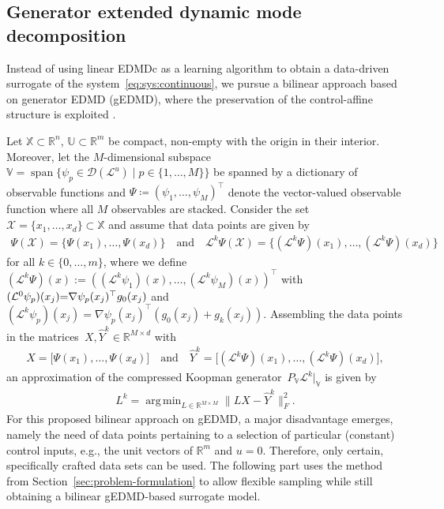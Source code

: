 \documentclass[a4paper, reqno]{amsart}
\newcommand{\R}{\ensuremath{\mathbb R}}
\DeclareMathOperator*{\argmin}{arg\,min}
\begin{document}
\subsection{Generator extended dynamic mode decomposition}
\label{subsec:generator:EDMD}

Instead of using linear EDMDc \cite{proctor2016dynamic, korda2018linear} as a learning algorithm to obtain a data-driven surrogate of the system~\eqref{eq:sys:continuous}, we pursue a bilinear approach based on generator EDMD (gEDMD), where the preservation of the control-affine structure is exploited \cite{williams2016extending, surana2016koopman, peitz:otto:rowley:2020}. 

Let $\mathbb{X} \subset \R^n$, $\mathbb{U} \subset \R^m$ be compact, non-empty with the origin in their interior. 
Moreover, let the $M$-dimensional subspace~$\mathbb{V} = \operatorname{span} \{\psi_p \in \mathcal{D}(\mathcal{L}^{u})  \mid p \in \{1, \dots, M\}\}$ be spanned by a dictionary of observable functions and $\Psi \coloneqq (\psi_1, \dots, \psi_M)^\top$ denote the vector-valued observable function where all $M$ observables are stacked. Consider the set $\mathcal{X} = \{x_1, \ldots, x_d\} \subset \mathbb{X}$ and assume that data points are given by 
\begin{align*}
    \Psi(\mathcal{X}) = \{\Psi(x_1), \dots, \Psi(x_d)\} \quad \text{and} \quad \mathcal{L}^k\Psi(\mathcal{X}) = \{(\mathcal{L}^k\Psi)(x_1), \dots, (\mathcal{L}^k\Psi)(x_d)\}
\end{align*}
for all $k \in \{0, \dots, m\}$, where we define $(\mathcal{L}^k\Psi)(x) := ((\mathcal{L}^k\psi_1)(x), \dots, (\mathcal{L}^k\psi_M)(x))^\top $ with $(\mathcal{L}^0\psi_p)(x_j) \hspace*{-1mm}=\hspace*{-1mm} \nabla \psi_p(x_j)^\top g_0(x_j)$ and $(\mathcal{L}^k\psi_p)(x_j) = \nabla \psi_p(x_j)^\top (g_0(x_j) + g_k(x_j))$. 
Assembling the data points in the matrices~$X, \hat{Y}^k \in \R^{M \times d}$ with 
\begin{align}\label{eq:generator:datamatrix}
    X = \Big[\Psi(x_1), \dots, \Psi(x_d)\Big]
    \quad \text{and} \quad 
    \hat{Y}^k = \Big[(\mathcal{L}^k\Psi)(x_1), \dots, (\mathcal{L}^k\Psi)(x_d)\Big],
\end{align}
an approximation of the compressed Koopman generator~$P_{\mathbb{V}}\mathcal{L}^k|_{\mathbb{V}}$ is given by
\begin{align} \label{eq:generator:regression}
    L^k = \argmin_{L \in \R^{M \times M}} \|LX - \hat{Y}^k\|_F^2.
\end{align}
For this proposed bilinear approach on gEDMD, a major disadvantage emerges, namely the need of data points pertaining to a selection of particular (constant) 
control inputs, e.g., the unit vectors of $\R^m$ and $u = 0$. 
Therefore, only certain, specifically crafted data sets can be used. 
The following part uses the method from Section~\ref{sec:problem-formulation} to allow flexible sampling while still obtaining a bilinear gEDMD-based surrogate model.
\\
\end{document}
